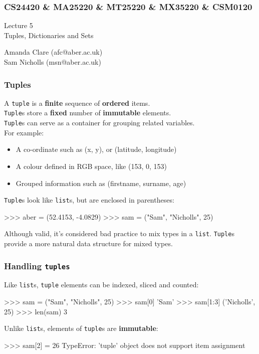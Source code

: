 \documentclass{beamer}
\begin{document}



\begin{frame}
\frametitle{CS24420 \& MA25220 \& MT25220 \& MX35220 \& CSM0120}

\begin{center}
\begin{huge}
Lecture 5\\
Tuples, Dictionaries and Sets
\end{huge}
\bigskip

Amanda Clare (afc@aber.ac.uk)\\
Sam Nicholls (msn@aber.ac.uk)

\end{center}
\end{frame}

\begin{frame}[fragile]
\frametitle{Tuples}
    A \texttt{tuple} is a \textbf{finite} sequence of \textbf{ordered} items.\\
    \texttt{Tuple}s store a \textbf{fixed} number of \textbf{immutable} elements.\\
    \texttt{Tuple}s can serve as a container for grouping related variables.
    \\For example:

    \begin{itemize}
        \item A co-ordinate such as (x, y), or (latitude, longitude)
        \item A colour defined in RGB space, like {\color{purple}(153, 0, 153)}
        \item Grouped information such as (firstname, surname, age)
    \end{itemize}

\vskip 0.3cm
    \texttt{Tuple}s look like \texttt{list}s, but are enclosed in parentheses:
\begin{code}
>>> aber = (52.4153, -4.0829)
>>> sam = ("Sam", "Nicholls", 25)
\end{code}
Although valid, it's considered bad practice to mix types in a \texttt{list}.
\texttt{Tuple}s provide a more natural data structure for mixed types.
\end{frame}


\begin{frame}[fragile]
\frametitle{Handling \texttt{tuples}}
    Like \texttt{list}s, \texttt{tuple} elements can be indexed, sliced and counted:
\begin{code}
>>> sam = ("Sam", "Nicholls", 25)
>>> sam[0]
'Sam'
>>> sam[1:3]
('Nicholls', 25)
>>> len(sam)
3
\end{code}

\vskip 0.3cm
Unlike \texttt{list}s, elements of \texttt{tuple}s are \textbf{immutable}:
\begin{code}
>>> sam[2] = 26
TypeError: 'tuple' object does not support
           item assignment
\end{code}
\end{frame}
\end{document}
